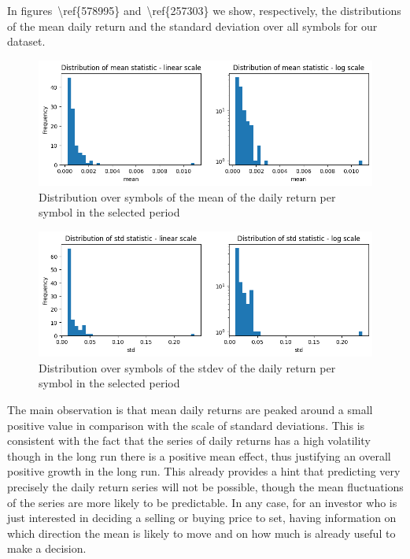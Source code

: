 \documentclass[10pt]{article}
\begin{document}
In figures~{\textbackslash ref\{578995\}}
and~{\textbackslash ref\{257303\}} we show, respectively, the
distributions of the mean daily return and the standard deviation over
all symbols for our dataset. ~
\begin{figure}[H]
\begin{center}
\includegraphics[width=0.98\columnwidth]{figures/output1/output1}
\caption{{Distribution over symbols of the mean of the daily return per symbol in
the selected period
{\label{578995}}%
}}
\end{center}
\end{figure}
\begin{figure}[H]
\begin{center}
\includegraphics[width=0.98\columnwidth]{figures/output2/output2}
\caption{{Distribution over symbols of the stdev of the daily return per symbol in
the selected period~
{\label{257303}}%
}}
\end{center}
\end{figure}

The main observation is that mean daily returns are peaked around a
small positive value in comparison with the scale of standard
deviations. This is consistent with the fact that the series of daily
returns has a high volatility though in the long run there is a positive
mean effect, thus justifying an overall positive growth in the long run.
This already provides a hint that predicting very precisely the daily
return series will not be possible, though the mean fluctuations of the
series are more likely to be predictable. In any case, for an investor
who is just interested in deciding a selling or buying price to set,
having information on which direction the mean is likely to move and on
how much is already useful to make a decision.
\end{document}
